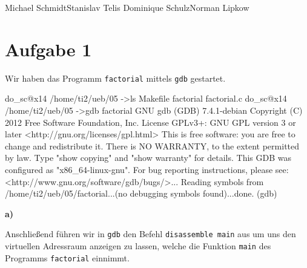 \documentclass{ti2}
\begin{document}
%
                {Michael Schmidt}{Stanislav Telis}%
                {Dominique Schulz}{Norman Lipkow}%
                  

\section*{Aufgabe 1}
Wir haben das Programm \texttt{factorial} mittels \texttt{gdb} gestartet.

\begin{listing}{1}
do_sc@x14 /home/ti2/ueb/05
->ls 
Makefile  factorial  factorial.c
do_sc@x14 /home/ti2/ueb/05
->gdb factorial
GNU gdb (GDB) 7.4.1-debian
Copyright (C) 2012 Free Software Foundation, Inc.
License GPLv3+: GNU GPL version 3 or later <http://gnu.org/licenses/gpl.html>
This is free software: you are free to change and redistribute it.
There is NO WARRANTY, to the extent permitted by law.  Type "show copying"
and "show warranty" for details.
This GDB was configured as "x86_64-linux-gnu".
For bug reporting instructions, please see:
<http://www.gnu.org/software/gdb/bugs/>...
Reading symbols from /home/ti2/ueb/05/factorial...(no debugging symbols found)...done.
(gdb) 
\end{listing}\par

\textbf{a)}\par
Anschließend führen wir in \texttt{gdb} den Befehl \texttt{disassemble main} aus um uns den virtuellen Adressraum anzeigen zu lassen, welche die Funktion \texttt{main} des Programms \texttt{factorial} einnimmt.
\end{document}
